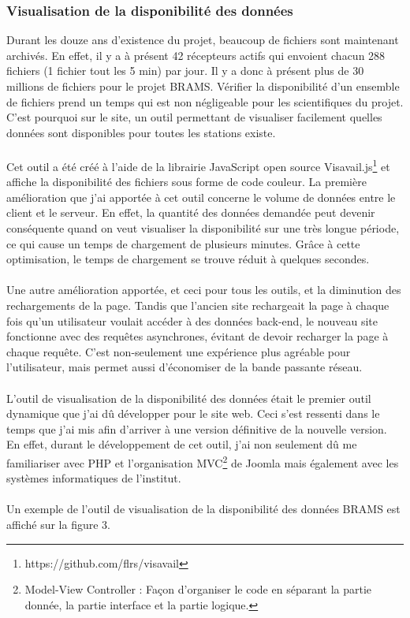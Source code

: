 \documentclass[11pt]{article}
\begin{document}
\subsubsection{Visualisation de la disponibilité des données}

Durant les douze ans d'existence du projet, beaucoup de fichiers sont maintenant archivés.
En effet, il y a à présent 42 récepteurs actifs qui envoient chacun 288 fichiers (1 fichier tout les 5 min) par jour.
Il y a donc à présent plus de 30 millions de fichiers pour le projet BRAMS.
Vérifier la disponibilité d'un ensemble de fichiers prend un temps qui est non négligeable pour les scientifiques du projet.
C'est pourquoi sur le site, un outil permettant de visualiser facilement quelles données sont disponibles pour toutes les stations existe.\\
\\
Cet outil a été créé à l'aide de la librairie JavaScript open source Visavail.js\footnote{https://github.com/flrs/visavail} et affiche la disponibilité des fichiers sous forme de code couleur.
La première amélioration que j'ai apportée à cet outil concerne le volume de données entre le client et le serveur.
En effet, la quantité des données demandée peut devenir conséquente quand on veut visualiser la disponibilité sur une très longue période, ce qui cause un temps de chargement de plusieurs minutes.
Grâce à cette optimisation, le temps de chargement se trouve réduit à quelques secondes.\\
\\
Une autre amélioration apportée, et ceci pour tous les outils, et la diminution des rechargements de la page.
Tandis que l'ancien site rechargeait la page à chaque fois qu'un utilisateur voulait accéder à des données back-end, le nouveau site fonctionne avec des requêtes asynchrones, évitant de devoir recharger la page à chaque requête.
C'est non-seulement une expérience plus agréable pour l'utilisateur, mais permet aussi d'économiser de la bande passante réseau.\\
\\
L'outil de visualisation de la disponibilité des données était le premier outil dynamique que j'ai dû développer pour le site web.
Ceci s'est ressenti dans le temps que j'ai mis afin d'arriver à une version définitive de la nouvelle version.
En effet, durant le développement de cet outil, j'ai non seulement dû me familiariser avec PHP et l'organisation MVC\footnote{Model-View Controller : Façon d'organiser le code en séparant la partie donnée, la partie interface et la partie logique.} de Joomla mais également avec les systèmes informatiques de l'institut.\\
\\
Un exemple de l'outil de visualisation de la disponibilité des données BRAMS est affiché sur la figure 3.
\end{document}
